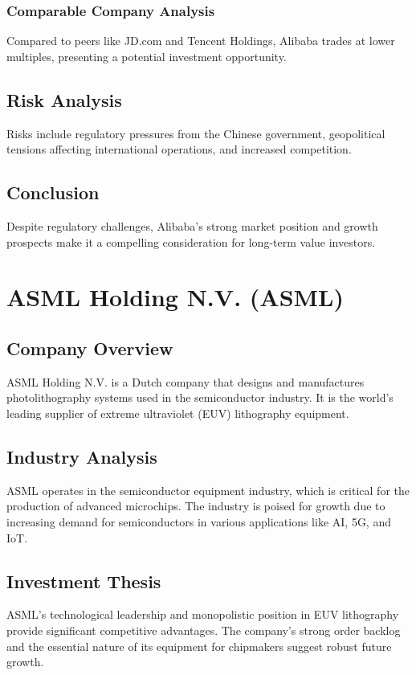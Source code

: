 \documentclass[12pt]{report}
\begin{document}
\subsection{Comparable Company Analysis}
Compared to peers like JD.com and Tencent Holdings, Alibaba trades at lower multiples, presenting a potential investment opportunity.

\section{Risk Analysis}
Risks include regulatory pressures from the Chinese government, geopolitical tensions affecting international operations, and increased competition.

\section{Conclusion}
Despite regulatory challenges, Alibaba's strong market position and growth prospects make it a compelling consideration for long-term value investors.

\chapter{ASML Holding N.V. (ASML)}
\section{Company Overview}
ASML Holding N.V. is a Dutch company that designs and manufactures photolithography systems used in the semiconductor industry. It is the world's leading supplier of extreme ultraviolet (EUV) lithography equipment.

\section{Industry Analysis}
ASML operates in the semiconductor equipment industry, which is critical for the production of advanced microchips. The industry is poised for growth due to increasing demand for semiconductors in various applications like AI, 5G, and IoT.

\section{Investment Thesis}
ASML's technological leadership and monopolistic position in EUV lithography provide significant competitive advantages. The company's strong order backlog and the essential nature of its equipment for chipmakers suggest robust future growth.
\end{document}
